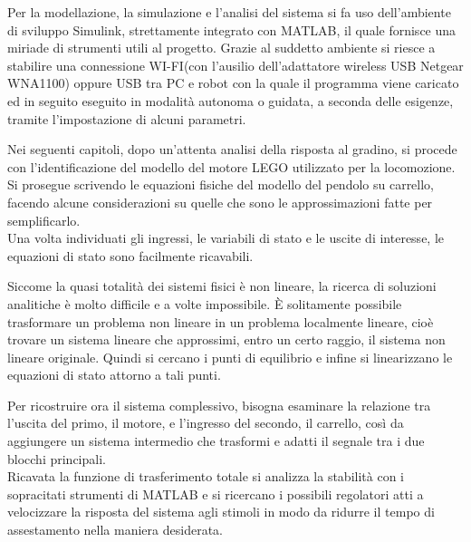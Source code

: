 Per la modellazione, la simulazione e l'analisi del sistema si fa uso dell'ambiente di sviluppo Simulink, strettamente integrato con MATLAB, il quale fornisce una miriade di strumenti utili al progetto.
Grazie al suddetto ambiente si riesce a stabilire una connessione WI-FI(con l'ausilio dell'adattatore wireless USB Netgear WNA1100) oppure USB tra PC e robot con la quale il programma viene caricato ed in seguito eseguito in modalità autonoma o guidata, a seconda delle esigenze, tramite l'impostazione di alcuni parametri.

Nei seguenti capitoli, dopo un'attenta analisi della risposta al gradino, si procede con l'identificazione del modello del motore LEGO utilizzato per la locomozione.\\
Si prosegue scrivendo le equazioni fisiche del modello del pendolo su carrello, facendo alcune considerazioni su quelle che sono le approssimazioni fatte per semplificarlo.\\
Una volta individuati gli ingressi, le variabili di stato e le uscite di interesse, le equazioni di stato sono facilmente ricavabili.

Siccome la quasi totalità dei sistemi fisici è non lineare, la ricerca di soluzioni analitiche è molto difficile e a volte impossibile. È solitamente possibile trasformare un problema non lineare in un problema localmente lineare, cioè trovare un sistema lineare che approssimi, entro un certo raggio, il sistema non lineare originale.
Quindi si cercano i punti di equilibrio e infine si linearizzano le equazioni di stato attorno a tali punti.

Per ricostruire ora il sistema complessivo, bisogna esaminare la relazione tra l'uscita del primo, il motore, e l'ingresso del secondo, il carrello, così da aggiungere un sistema intermedio che trasformi e adatti il segnale tra i due blocchi principali.\\
Ricavata la funzione di trasferimento totale si analizza la stabilità con i sopracitati strumenti di MATLAB e si ricercano  i possibili regolatori atti a velocizzare la risposta del sistema agli stimoli in modo da ridurre il tempo di assestamento nella maniera desiderata.\\



